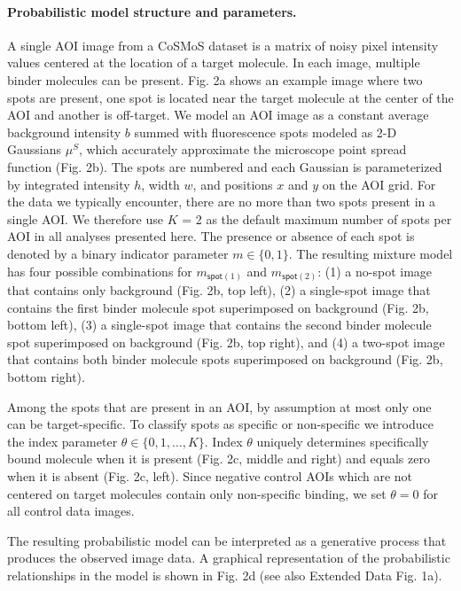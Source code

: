 \paragraph{Probabilistic model structure and parameters.} %
A single AOI image from a CoSMoS dataset is a matrix of noisy pixel intensity values centered at the location of a target molecule. In each image, multiple binder molecules can be present. Fig. 2a shows an example image where two spots are present, one spot is located near the target molecule at the center of the AOI and another is off-target. We model an AOI image as a constant average background intensity $b$ summed with fluorescence spots modeled as 2-D Gaussians $\mu^S$, which accurately approximate the microscope point spread function \cite{Zhang2007-rb} (Fig. 2b). The spots are numbered and each Gaussian is parameterized by integrated intensity $h$, width $w$, and positions $x$ and $y$ on the AOI grid. For the data we typically encounter, there are no more than two spots present in a single AOI. We therefore use $K$ = 2 as the default maximum  number of spots per AOI in all analyses presented here. The presence or absence of each spot is denoted by a binary indicator parameter $m \in \{0, 1\}$. The resulting mixture model has four possible combinations for $m_{\mathsf{spot}(1)}$ and $m_{\mathsf{spot}(2)}$: (1) a no-spot image that contains only background (Fig. 2b, top left), (2) a single-spot image that contains the first binder molecule spot superimposed on background (Fig. 2b, bottom left), (3) a single-spot image that contains the second binder molecule spot superimposed on background (Fig. 2b, top right), and (4) a two-spot image that contains both binder molecule spots superimposed on background (Fig. 2b, bottom right).

Among the spots that are present in an AOI, by assumption at most only one can be target-specific. To classify spots as specific or non-specific we introduce the index parameter $\theta \in \{0,1,\dots,K\}$. Index $\theta$ uniquely determines specifically bound molecule when it is present (Fig. 2c, middle and right) and equals zero when it is absent (Fig. 2c, left). Since negative control AOIs which are not centered on target molecules contain only non-specific binding, we set $\theta = 0$ for all control data images. 

The resulting probabilistic model can be interpreted as a generative process that produces the observed image data. A graphical representation of the probabilistic relationships in the model is shown in Fig. 2d (see also Extended Data Fig. 1a).

